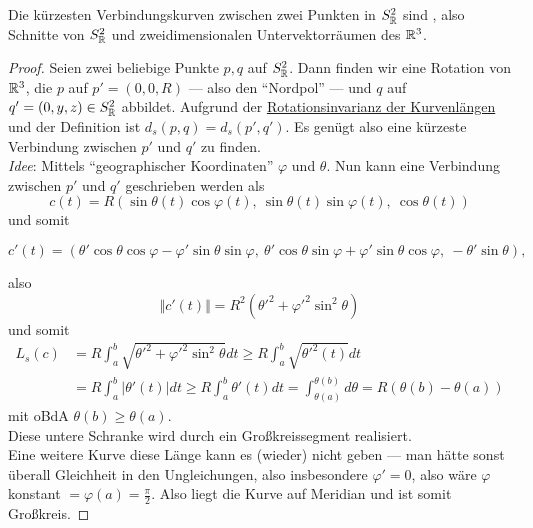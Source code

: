 \begin{lemma}
  Die kürzesten Verbindungskurven zwischen zwei Punkten in $ S^2_{\mathbb{R}} $ sind , also Schnitte von $ S^2_{\mathbb{R}} $ und zweidimensionalen Untervektorräumen des $ \mathbb{R}^3 $.
  \begin{proof}
    Seien zwei beliebige Punkte $ p,q $ auf $ S^2_{\mathbb{R}} $. Dann finden wir eine Rotation von $ \mathbb{R}^3 $, die $ p $ auf $ p' = (0,0,R) $ --- also den ``Nordpol'' --- und $ q $ auf $ q' = (0,y,z) \in S^2_{\mathbb{R}} $ abbildet. Aufgrund der \hyperref[lemma:kurvenlaengen]{Rotationsinvarianz der Kurvenlängen} und der Definition ist $ d_s(p,q) = d_s(p', q') $. Es genügt also eine kürzeste Verbindung zwischen $ p' $ und $ q' $ zu finden. \\
    \emph{Idee}: Mittels ``geographischer Koordinaten'' $ \varphi $ und $ \theta $. Nun kann eine Verbindung zwischen $ p' $ und $ q' $ geschrieben werden als
    \begin{equation*}
      c(t) = R(\sin\theta(t)\cos\varphi(t), \ \sin\theta(t)\sin\varphi(t), \ \cos\theta(t))
    \end{equation*}
    und somit
    \begin{small}
      \begin{equation*}
        c'(t) = (\theta'\cos\theta\cos\varphi-\varphi'\sin\theta\sin\varphi, \ \theta'\cos\theta\sin\varphi+\varphi'\sin\theta\cos\varphi, \ -\theta'\sin\theta)\text{,}
      \end{equation*}
    \end{small}
    also
    \begin{equation*}
      \Vert c'(t) \Vert = R^2({\theta'}^2 + {\varphi'}^2\sin^2\theta)
    \end{equation*}
    und somit
    \begin{align*}
      L_s(c) &= R\int_a^b\sqrt{{\theta'}^2+{\varphi'}^2\sin^2\theta}dt \geq R\int_a^b\sqrt{{\theta'}^2(t)}dt \\
      &= R\int_a^b \vert \theta'(t) \vert dt \geq R\int_a^b \theta'(t)dt = \int_{\theta(a)}^{\theta(b)}d\theta = R(\theta(b)-\theta(a))
    \end{align*}
    mit oBdA $ \theta(b) \geq \theta(a) $. \\
    Diese untere Schranke wird durch ein Großkreissegment realisiert. \\
    Eine weitere Kurve diese Länge kann es (wieder) nicht geben --- man hätte sonst überall Gleichheit in den Ungleichungen, also insbesondere $ \varphi' = 0 $, also wäre $ \varphi $ konstant $ = \varphi(a) = \frac{\pi}{2} $. Also liegt die Kurve auf Meridian und ist somit Großkreis.
  \end{proof}
\end{lemma}

